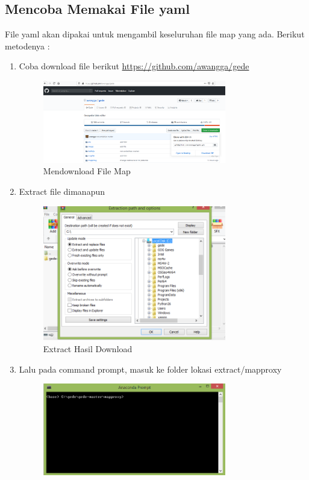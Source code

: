\subsection{Mencoba Memakai File yaml}
File yaml akan dipakai untuk mengambil keseluruhan file map yang ada. Berikut metodenya : 
\begin{enumerate}
    \item Coba download file berikut \href{Awangga/Gede}{https://github.com/awangga/gede}
    \hfill\break
	\begin{figure}[H]
		\includegraphics[width=8cm]{figures/1174035/tugas4/yaml_1.png}
		\centering
		\caption{Mendownload File Map}
	\end{figure}
    \item Extract file dimanapun
    \hfill\break
	\begin{figure}[H]
		\includegraphics[width=8cm]{figures/1174035/tugas4/yaml_2.png}
		\centering
		\caption{Extract Hasil Download}
	\end{figure}
    \item Lalu pada command prompt, masuk ke folder lokasi extract/mapproxy
    \hfill\break
	\begin{figure}[H]
		\includegraphics[width=8cm]{figures/1174035/tugas4/yaml_3.png}

\end{figure}
\end{enumerate}
